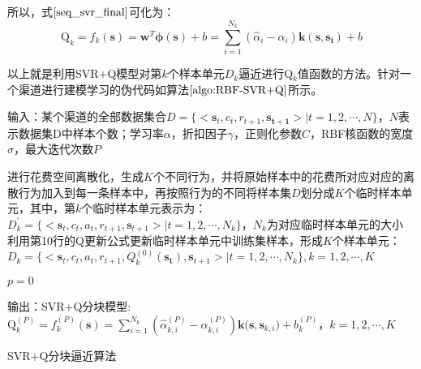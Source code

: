 所以，式$\eqref{seq_svr_final}$可化为：
\begin{equation}\label{seq_final}
\text{Q}_{k}=f_{k}(\bm{s})=\bm{w}^{T} \bm{\phi(s)} + b=\sum_{i=1}^{N_{k}}(\hat{\alpha}_{i}-\alpha_{i})\bm{k(s,s_{i})}+b
\end{equation}

以上就是利用SVR+Q模型对第$k$个样本单元$D_{k}$逼近进行Q$_{k}$值函数的方法。针对一个渠道进行建模学习的伪代码如算法$\ref{algo:RBF-SVR+Q}$所示。

\begin{algorithm}[htbp]
\small
\SetAlgoLined
{} 
输入：某个渠道的全部数据集合$D=\{<\mathbf{s}_{t},c_{t},r_{t+1},\mathbf{s_{t+1}}>|t=1,2,\cdots,N\}$，$N$表示数据集D中样本个数；学习率$\alpha$，折扣因子$\gamma$，正则化参数$C$，RBF核函数的宽度$\sigma$，最大迭代次数$P$\;

进行花费空间离散化，生成$K$个不同行为，并将原始样本中的花费所对应对应的离散行为加入到每一条样本中，再按照行为的不同将样本集$D$划分成$K$个临时样本单元，其中，第$k$个临时样本单元表示为：$D_{k}^{'}=\{<\mathbf{s}_{t},c_{t},a_{t},r_{t+1},\mathbf{s}_{t+1}>|t=1,2,\cdots,N_{k}\}$，$N_{k}$为对应临时样本单元的大小\;
利用第10行的Q更新公式更新临时样本单元中训练集样本，形成$K$个样本单元：$D_{k}=\{<\mathbf{s}_{t},c_{t},a_{t},r_{t+1},Q_{k}^{(0)}(\mathbf{s_{t}}),\mathbf{s}_{t+1}>|t=1,2,\cdots,N_{k}\}, k=1,2,\cdots,K$\;

$p=0$\;

输出：SVR+Q分块模型:$\text{Q}_{k}^{(P)}=f_{k}^{(P)}(\bm{s})=\sum_{i=1}^{N_{k}}(\hat{\alpha}_{k,i}^{(P)}-\alpha_{k,i}^{(P)})\bm{k(}\bm{s},\bm{s}_{k,i}\bm{)}+b_{k}^{(P)}$，$k=1,2,\cdots,K$\;
\caption{SVR+Q分块逼近算法}
\label{algo:RBF-SVR+Q}
\end{algorithm}

